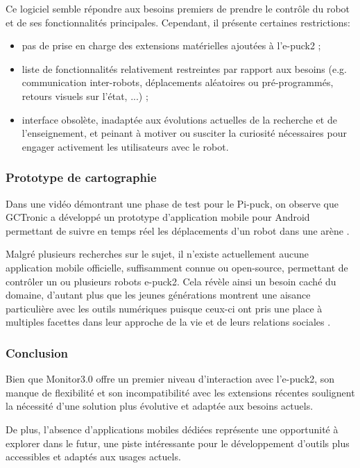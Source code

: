 Ce logiciel semble répondre aux besoins premiers de prendre le contrôle du robot et de ses fonctionnalités principales. 
Cependant, il présente certaines restrictions:
\begin{itemize}
    \item pas de prise en charge des extensions matérielles ajoutées à l'e-puck2 ;
    \item liste de fonctionnalités relativement restreintes par rapport aux besoins (e.g. communication inter-robots, déplacements aléatoires ou pré-programmés, retours visuels sur l'état, ...) ;
    \item interface obsolète, inadaptée aux évolutions actuelles de la recherche et de l’enseignement, et peinant à motiver ou susciter la curiosité nécessaires pour engager activement les utilisateurs avec le robot.
\end{itemize}

\subsubsection{Prototype de cartographie}
Dans une vidéo démontrant une phase de test pour le Pi-puck, on observe que GCTronic a développé un prototype d'application mobile pour Android permettant de suivre en temps réel les déplacements d'un robot dans une arène \autocite{gctronic_pi-puck_nodate}.

Malgré plusieurs recherches sur le sujet, il n'existe actuellement aucune application mobile officielle, suffisamment connue ou open-source, permettant de contrôler un ou plusieurs robots e-puck2.
Cela révèle ainsi un besoin caché du domaine, d'autant plus que les jeunes générations montrent une aisance particulière avec les outils numériques puisque ceux-ci ont pris une place à multiples facettes dans leur approche de la vie et de leurs relations sociales \autocite{tully_growing_2003}.

\subsubsection{Conclusion}
Bien que Monitor3.0 offre un premier niveau d'interaction avec l'e-puck2, son manque de flexibilité et son incompatibilité avec les extensions récentes soulignent la nécessité d'une solution plus évolutive et adaptée aux besoins actuels.

De plus, l'absence d'applications mobiles dédiées représente une opportunité à explorer dans le futur, une piste intéressante pour le développement d'outils plus accessibles et adaptés aux usages actuels.
